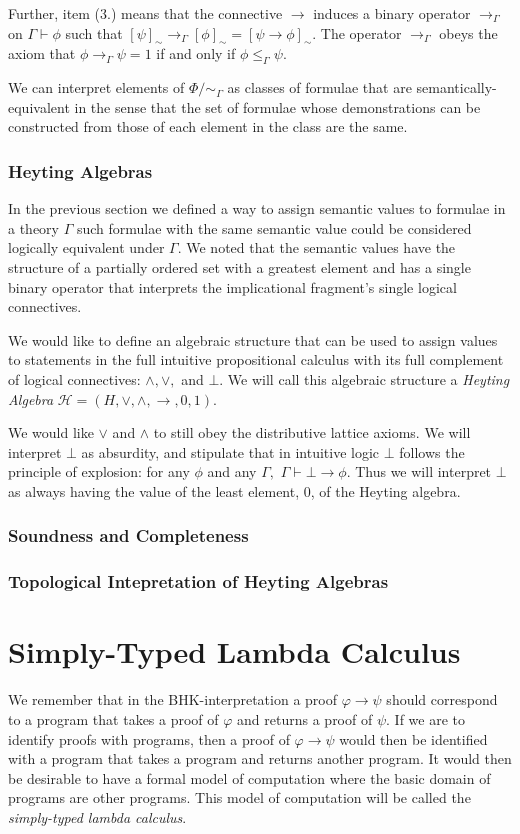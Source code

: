 \documentclass[12pt]{article}
\renewcommand{\leq}{\leqslant}
\begin{document}
Further, item (3.) means that the connective $\to$
induces a binary operator $\to_\Gamma$ on $\Gamma\vdash\phi$ such that $[\psi]_\sim\to_\Gamma[\phi]_\sim=[\psi\to\phi]_\sim$.
The operator $\to_\Gamma$ obeys the axiom that $\phi\to_\Gamma\psi = 1$ if and only if $\phi \leq_\Gamma \psi$. 

We can interpret elements of $\Phi/\sim_\Gamma$ as classes of formulae that are semantically-equivalent
in the sense that the set of formulae whose demonstrations can be constructed from those 
of each element in the class are the same. 

\subsubsection{Heyting Algebras}
In the previous section we defined a way to assign semantic values to formulae
in a theory $\Gamma$ such formulae with the same semantic value could be considered
logically equivalent under $\Gamma$.
We noted that the semantic values have the structure of a partially ordered set
with a greatest element and has a single binary operator that interprets the
implicational fragment's single logical connectives. 

We would like to define an algebraic structure that can be used to assign values
to statements in the full intuitive propositional calculus with its full complement
of logical connectives: $\wedge,\vee,$ and $\bot$. 
We will call this algebraic structure a \textit{Heyting Algebra} $\mathcal{H}=(H,\vee,\wedge,\to,0,1)$. 

We would like $\vee$ and $\wedge$ to still obey the distributive lattice axioms. 
We will interpret $\bot$ as absurdity, and stipulate that in intuitive logic $\bot$ follows
the principle of explosion: for any $\phi$ and any $\Gamma,$ $\Gamma\vdash\bot\to\phi$. 
Thus we will interpret $\bot$ as always having the value of the least element, $0$, of the Heyting algebra.
 




\subsubsection{Soundness and Completeness}
\subsubsection{Topological Intepretation of Heyting Algebras}
\section{Simply-Typed Lambda Calculus}
We remember that in the BHK-interpretation a proof $\varphi\to\psi$ should correspond 
to a program that takes a proof of $\varphi$ and returns a proof of $\psi$. 
If we are to identify proofs with programs, then a proof of $\varphi\to\psi$ would then
be identified with a program that takes a program and returns another program. 
It would then be desirable to have a formal model of computation where the basic domain of programs
are other programs. 
This model of computation will be called the \textit{simply-typed lambda calculus}. 
\end{document}
